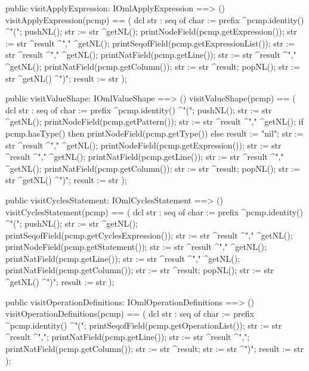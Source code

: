 \begin{vdm_al}
  public visitApplyExpression: IOmlApplyExpression ==> ()
  visitApplyExpression(pcmp) ==
    ( dcl str : seq of char := prefix ^pcmp.identity() ^"(";
      pushNL();
      str := str ^getNL();
      printNodeField(pcmp.getExpression());
      str := str ^result ^"," ^getNL();
      printSeqofField(pcmp.getExpressionList());
      str := str ^result ^"," ^getNL();
      printNatField(pcmp.getLine());
      str := str ^result ^"," ^getNL();
      printNatField(pcmp.getColumn());
      str := str ^result;
      popNL();
      str := str ^getNL() ^")";
      result := str );

  public visitValueShape: IOmlValueShape ==> ()
  visitValueShape(pcmp) ==
    ( dcl str : seq of char := prefix ^pcmp.identity() ^"(";
      pushNL();
      str := str ^getNL();
      printNodeField(pcmp.getPattern());
      str := str ^result ^"," ^getNL();
      if pcmp.hasType()
      then printNodeField(pcmp.getType())
      else result := "nil";
      str := str ^result ^"," ^getNL();
      printNodeField(pcmp.getExpression());
      str := str ^result ^"," ^getNL();
      printNatField(pcmp.getLine());
      str := str ^result ^"," ^getNL();
      printNatField(pcmp.getColumn());
      str := str ^result;
      popNL();
      str := str ^getNL() ^")";
      result := str );

  public visitCyclesStatement: IOmlCyclesStatement ==> ()
  visitCyclesStatement(pcmp) ==
    ( dcl str : seq of char := prefix ^pcmp.identity() ^"(";
      pushNL();
      str := str ^getNL();
      printSeqofField(pcmp.getCyclesExpression());
      str := str ^result ^"," ^getNL();
      printNodeField(pcmp.getStatement());
      str := str ^result ^"," ^getNL();
      printNatField(pcmp.getLine());
      str := str ^result ^"," ^getNL();
      printNatField(pcmp.getColumn());
      str := str ^result;
      popNL();
      str := str ^getNL() ^")";
      result := str );

  public visitOperationDefinitions: IOmlOperationDefinitions ==> ()
  visitOperationDefinitions(pcmp) ==
    ( dcl str : seq of char := prefix ^pcmp.identity() ^"(";
      printSeqofField(pcmp.getOperationList());
      str := str ^result ^",";
      printNatField(pcmp.getLine());
      str := str ^result ^",";
      printNatField(pcmp.getColumn());
      str := str ^result;
      str := str ^")";
      result := str );


\end{vdm_al}
